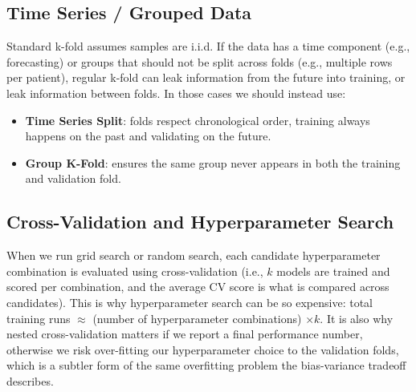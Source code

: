 \documentclass[conference]{IEEEtran}
\begin{document}
\subsection*{Time Series / Grouped Data}
Standard k-fold assumes samples are i.i.d. If the data has a time component (e.g., forecasting) or groups that should not be split across folds (e.g., multiple rows per patient), regular k-fold can leak information from the future into training, or leak information between folds. In those cases we should instead use:
\begin{itemize}
    \item \textbf{Time Series Split}: folds respect chronological order, training always happens on the past and validating on the future.
    \item \textbf{Group K-Fold}: ensures the same group never appears in both the training and validation fold.
\end{itemize}

\subsection*{Cross-Validation and Hyperparameter Search}
When we run grid search or random search, each candidate hyperparameter combination is evaluated using cross-validation (i.e., $k$ models are trained and scored per combination, and the average CV score is what is compared across candidates). This is why hyperparameter search can be so expensive: total training runs $\approx$ (number of hyperparameter combinations) $\times k$. It is also why nested cross-validation matters if we report a final performance number, otherwise we risk over-fitting our hyperparameter choice to the validation folds, which is a subtler form of the same overfitting problem the bias-variance tradeoff describes.
\end{document}
